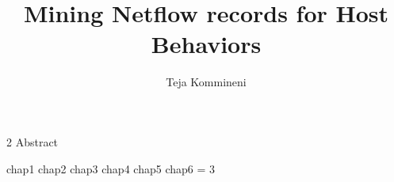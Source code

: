 \documentclass[11pt,Chicago]{uuthesis2e}
\author                 {Teja Kommineni}
\title                  {Mining Netflow records for Host Behaviors}
\begin{document}
	
	\frontmatterformat
	\titlepage
	\copyrightpage
	\dissertationapproval
	\setcounter {page}     {2}             %
	 {Abstract}
	
	
	\tableofcontents
	\listoffigures
	\listoftables
	
	
	
	
	
	\maintext       %
	
	\pagestyle{headings} %
	
	 {chap1}
	 {chap2}
	 {chap3}
	 {chap4}
	 {chap5}
	 {chap6}
	\numberofappendices = 3
	\appendix       %
	
	
\end{document}
